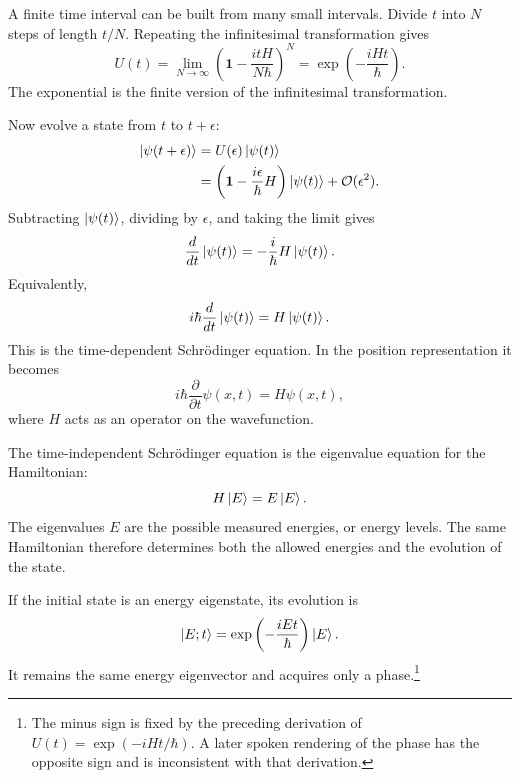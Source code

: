A finite time interval can be built from many small intervals. Divide \(t\) into \(N\) steps of length \(t/N\). Repeating the infinitesimal transformation gives
\begin{equation}
U(t)
=
\lim_{N\to\infty}
\left(
\mathbf 1-\frac{itH}{N\hbar}
\right)^N
=
\exp\left(-\frac{iHt}{\hbar}\right).
\end{equation}
The exponential is the finite version of the infinitesimal transformation.

Now evolve a state from \(t\) to \(t+\epsilon\):
\begin{align}
\left\lvert\psi(t+\epsilon)\right\rangle
&=
U(\epsilon)\left\lvert\psi(t)\right\rangle
\\
&=
\left(
\mathbf 1-\frac{i\epsilon}{\hbar}H
\right)\left\lvert\psi(t)\right\rangle
+\mathcal O(\epsilon^2).
\end{align}
Subtracting \(\left\lvert\psi(t)\right\rangle\), dividing by \(\epsilon\), and taking the limit gives
\begin{equation}
\frac{d}{dt}\left\lvert\psi(t)\right\rangle
=
-\frac{i}{\hbar}H\left\lvert\psi(t)\right\rangle.
\end{equation}
Equivalently,
\begin{equation}
i\hbar\frac{d}{dt}\left\lvert\psi(t)\right\rangle
=
H\left\lvert\psi(t)\right\rangle.
\end{equation}
This is the time-dependent Schr\"odinger equation. In the position representation it becomes
\begin{equation}
i\hbar\frac{\partial}{\partial t}\psi(x,t)
=
H\psi(x,t),
\end{equation}
where \(H\) acts as an operator on the wavefunction.

The time-independent Schr\"odinger equation is the eigenvalue equation for the Hamiltonian:
\begin{equation}
H\left\lvert E\right\rangle=E\left\lvert E\right\rangle.
\end{equation}
The eigenvalues \(E\) are the possible measured energies, or energy levels. The same Hamiltonian therefore determines both the allowed energies and the evolution of the state.

If the initial state is an energy eigenstate, its evolution is
\begin{equation}
\left\lvert E;t\right\rangle
=
\exp\left(-\frac{iEt}{\hbar}\right)\left\lvert E\right\rangle.
\end{equation}
It remains the same energy eigenvector and acquires only a phase.\footnote{The minus sign is fixed by the preceding derivation of \(U(t)=\exp(-iHt/\hbar)\). A later spoken rendering of the phase has the opposite sign and is inconsistent with that derivation.}

\begin{classroomqa}
\end{classroomqa}

